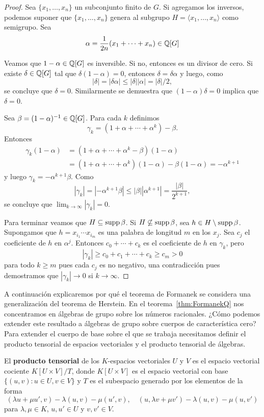 \begin{proof}
	Sea $\{x_1,\dots,x_n\}$ un subconjunto finito de $G$. Si agregamos los
	inversos, podemos suponer que $\{x_1,\dots,x_n\}$ genera al subgrupo
	$H=\langle x_1,\dots,x_n\rangle$ como semigrupo. Sea
	\[
		\alpha=\frac{1}{2n}(x_1+\cdots+x_n)\in\mathbb{Q}[G]
	\]

	Veamos que $1-\alpha\in\mathbb{Q}[G]$ es inversible. Si no, entonces es un divisor de cero. 
	Si existe $\delta\in\mathbb{Q}[G]$ tal que $\delta(1-\alpha)=0$, entonces
	$\delta=\delta\alpha$ y luego, como 
	\[
		|\delta|=|\delta\alpha|\leq|\delta||\alpha|=|\delta|/2,
	\]
	se concluye que $\delta=0$. Similarmente se demuestra que $(1-\alpha)\delta=0$ implica que
	$\delta=0$. 
	
	Sea $\beta=(1-\alpha)^{-1}\in\mathbb{Q}[G]$.  Para cada $k$ definimos 
	\[
		\gamma_k=(1+\alpha+\cdots+\alpha^k)-\beta.
	\]
	Entonces 
	\begin{align*}
		\gamma_k(1-\alpha)&=(1+\alpha+\cdots+\alpha^k-\beta)(1-\alpha)\\
		&=(1+\alpha+\cdots+\alpha^k)(1-\alpha)-\beta(1-\alpha)=-\alpha^{k+1}
	\end{align*}
	y luego 
	$\gamma_k=-\alpha^{k+1}\beta$. Como 
	\[
		|\gamma_k|=|-\alpha^{k+1}\beta|\leq|\beta||\alpha^{k+1}|=\frac{|\beta|}{2^{k+1}},
	\]
	se concluye que $\lim_{k\to\infty}|\gamma_k|=0$. 

	Para terminar veamos que $H\subseteq\operatorname{supp}\beta$. Si
	$H\not\subseteq\operatorname{supp}\beta$, sea $h\in H\setminus\operatorname{supp}\beta$.  Supongamos
	que $h=x_{i_1}\cdots x_{i_m}$ es una palabra de longitud $m$ en los $x_j$.
	Sea $c_j$ el coeficiente de $h$ en $\alpha^j$. Entonces $c_0+\cdots+c_k$ es
	el coeficiente de $h$ en $\gamma_k$, pero
	\[
		|\gamma_k|\geq c_0+c_1+\cdots+c_k\geq c_m>0
	\]
	para todo $k\geq m$ pues cada $c_j$ es no negativo, una contradicción pues
	demostramos que $|\gamma_k|\to 0$ si $k\to\infty$.
\end{proof}

A continuación explicaremos por qué el teorema de Formanek se considera una
generalización del teorema de Herstein. En el teorema~\ref{thm:FormanekQ} nos
concentramos en álgebras de grupo sobre los números racionales. ¿Cómo podemos
extender este resultado a álgebras de grupo sobre cuerpos de característica
cero? Para extender el cuerpo de base sobre el que se trabaja necesitamos
definir el producto tensorial de espacios vectoriales y el producto tensorial
de álgebras.

\begin{definition}
	El \textbf{producto tensorial} de los $K$-espacios vectoriales $U$ y $V$ es
	el espacio vectorial cociente $K[U\times V]/T$, donde $K[U\times V]$ es el
	espacio vectorial con base $\{(u,v):u\in U,v\in V\}$ y $T$ es el subespacio
	generado por los elementos de la forma
	\[
		(\lambda u+\mu u',v)-\lambda(u,v)-\mu(u',v),\quad
		(u,\lambda v+\mu v')-\lambda(u,v)-\mu(u,v')
	\]
	para $\lambda,\mu\in K$, $u,u'\in U$ y $v,v'\in V$.
\end{definition}

